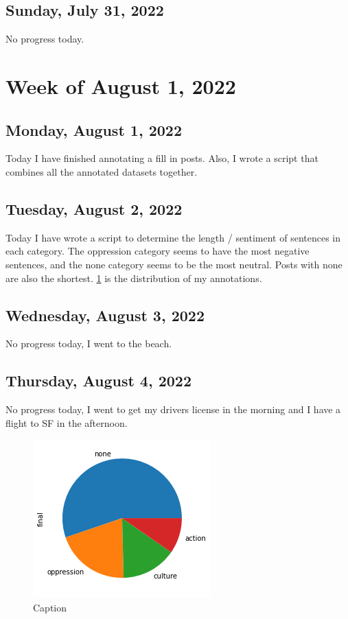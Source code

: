 \documentclass[11pt,letterpaper]{article}
\begin{document}
\subsection{Sunday, July 31, 2022}
No progress today.

\section{Week of August 1, 2022}
\subsection{Monday, August 1, 2022}
Today I have finished annotating a fill in posts. Also, I wrote a script that combines all the annotated datasets together.

\subsection{Tuesday, August 2, 2022}
Today I have wrote a script to determine the length / sentiment of sentences in each category. The oppression category seems to have the most negative sentences, and the none category seems to be the most neutral. Posts with none are also the shortest. \ref{fig:ganning_dist} is the distribution of my annotations.

\subsection{Wednesday, August 3, 2022}
No progress today, I went to the beach.

\subsection{Thursday, August 4, 2022}
No progress today, I went to get my drivers license in the morning and I have a flight to SF in the afternoon.

\begin{figure}
    \centering
    \includegraphics[scale=1]{images/ganning_dist.png}
    \caption{Caption}
    \label{fig:ganning_dist}
\end{figure}
\end{document}
